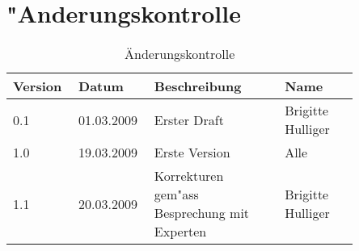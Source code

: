\section*{"Anderungskontrolle}

\begin{table}[ht]
\begin{tabular}{|p{0.15\linewidth}|p{0.15\linewidth}|p{0.35\linewidth}|p{0.2\linewidth}|}
\hline \bfseries Version & \bfseries Datum & \bfseries Beschreibung & \bfseries Name \\ \hline 
\hline 0.1 & 01.03.2009 & Erster Draft & Brigitte Hulliger \\ 
\hline 1.0 & 19.03.2009 & Erste Version & Alle \\ 
\hline 1.1 & 20.03.2009 & Korrekturen gem"ass Besprechung mit Experten & Brigitte Hulliger \\
\hline
\end{tabular}
\caption{\"Anderungskontrolle}
\end{table}
